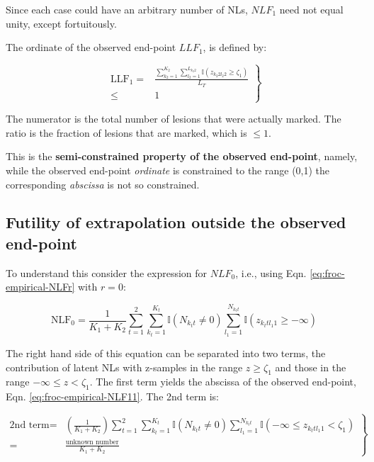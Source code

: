 \documentclass[
]{book}
\begin{document}
Since each case could have an arbitrary number of NLs, \(NLF_1\) need not equal unity, except fortuitously.

The ordinate of the observed end-point \(LLF_1\), is defined by:

\begin{equation}
\left.
\begin{aligned}
\text{LLF}_1 =& \frac{ \sum_{k_2=1}^{K_2} \sum_{l_2=1}^{L_{k_2 2}} \mathbb{I} \left ( z_{k_2 2 l_2 2} \geq  \zeta_1  \right ) }{L_T}\\
\leq& 1
\end{aligned}
\right \}
\label{eq:froc-empirical-LLF1a}
\end{equation}

The numerator is the total number of lesions that were actually marked. The ratio is the fraction of lesions that are marked, which is \(\leq 1\).

This is the \textbf{semi-constrained property of the observed end-point}, namely, while the observed end-point \emph{ordinate} is constrained to the range (0,1) the corresponding \emph{abscissa} is not so constrained.

\hypertarget{froc-empirical-froc-plot-futility-extrapolation}{%
\subsection{Futility of extrapolation outside the observed end-point}\label{froc-empirical-froc-plot-futility-extrapolation}}

To understand this consider the expression for \(NLF_0\), i.e., using Eqn. \eqref{eq:froc-empirical-NLFr} with \(r = 0\):

\begin{equation}
\text{NLF}_0 = \frac{1}{K_1+K_2} \sum_{t=1}^{2} \sum_{k_t=1}^{K_t} \mathbb{I} \left ( N_{k_t t} \neq 0 \right ) \sum_{l_1=1}^{N_{k_t t}} \mathbb{I} \left ( z_{k_t t l_1 1} \geq -\infty \right ) 
\end{equation}

The right hand side of this equation can be separated into two terms, the contribution of latent NLs with z-samples in the range \(z \geq \zeta_1\) and those in the range \(-\infty \leq z < \zeta_1\). The first term yields the abscissa of the observed end-point, Eqn. \eqref{eq:froc-empirical-NLF11}. The 2nd term is:

\begin{equation}
\left. 
\begin{aligned} 
\text{2nd term}=&\left (\frac{1}{K_1+K_2} \right )\sum_{t=1}^{2} \sum_{k_t=1}^{K_t} \mathbb{I} \left ( N_{k_t t} \neq 0 \right ) \sum_{l_1=1}^{N_{k_t t}} \mathbb{I} \left ( -\infty \leq z_{k_t t l_1 1} < \zeta_1 \right )\\
=&\frac{\text{unknown number}}{K_1+K_2}
\end{aligned}
\right \} 
\label{eq:froc-empirical-NLF0a}
\end{equation}
\end{document}
